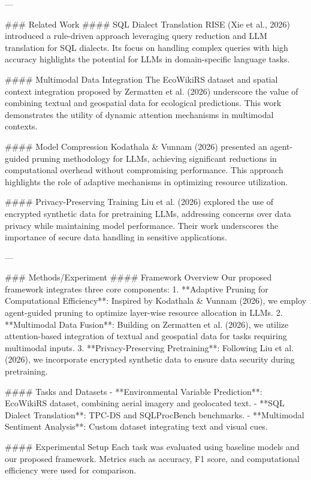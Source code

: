 ---

### Related Work
#### SQL Dialect Translation
RISE (Xie et al., 2026) introduced a rule-driven approach leveraging query reduction and LLM translation for SQL dialects. Its focus on handling complex queries with high accuracy highlights the potential for LLMs in domain-specific language tasks.

#### Multimodal Data Integration
The EcoWikiRS dataset and spatial context integration proposed by Zermatten et al. (2026) underscore the value of combining textual and geospatial data for ecological predictions. This work demonstrates the utility of dynamic attention mechanisms in multimodal contexts.

#### Model Compression
Kodathala & Vunnam (2026) presented an agent-guided pruning methodology for LLMs, achieving significant reductions in computational overhead without compromising performance. This approach highlights the role of adaptive mechanisms in optimizing resource utilization.

#### Privacy-Preserving Training
Liu et al. (2026) explored the use of encrypted synthetic data for pretraining LLMs, addressing concerns over data privacy while maintaining model performance. Their work underscores the importance of secure data handling in sensitive applications.

---

### Methods/Experiment
#### Framework Overview
Our proposed framework integrates three core components: 
1. **Adaptive Pruning for Computational Efficiency**: Inspired by Kodathala & Vunnam (2026), we employ agent-guided pruning to optimize layer-wise resource allocation in LLMs.
2. **Multimodal Data Fusion**: Building on Zermatten et al. (2026), we utilize attention-based integration of textual and geospatial data for tasks requiring multimodal inputs.
3. **Privacy-Preserving Pretraining**: Following Liu et al. (2026), we incorporate encrypted synthetic data to ensure data security during pretraining.

#### Tasks and Datasets
- **Environmental Variable Prediction**: EcoWikiRS dataset, combining aerial imagery and geolocated text.
- **SQL Dialect Translation**: TPC-DS and SQLProcBench benchmarks.
- **Multimodal Sentiment Analysis**: Custom dataset integrating text and visual cues.

#### Experimental Setup
Each task was evaluated using baseline models and our proposed framework. Metrics such as accuracy, F1 score, and computational efficiency were used for comparison.

